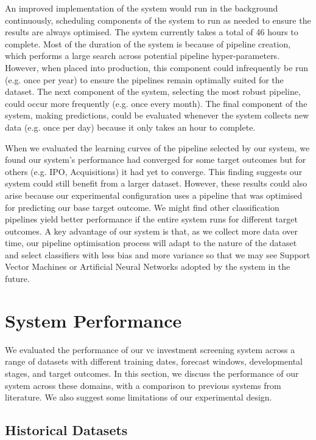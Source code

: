 \documentclass[../thesis/thesis.tex]{subfiles}
\begin{document}
An improved implementation of the system would run in the background continuously, scheduling components of the system to run as needed to ensure the results are always optimised. The system currently takes a total of 46 hours to complete. Most of the duration of the system is because of pipeline creation, which performs a large search across potential pipeline hyper-parameters. However, when placed into production, this component could infrequently be run (e.g. once per year) to ensure the pipelines remain optimally suited for the dataset. The next component of the system, selecting the most robust pipeline, could occur more frequently (e.g. once every month). The final component of the system, making predictions, could be evaluated whenever the system collects new data (e.g. once per day) because it only takes an hour to complete.

When we evaluated the learning curves of the pipeline selected by our system, we found our system's performance had converged for some target outcomes but for others (e.g. IPO, Acquisitions) it had yet to converge. This finding suggests our system could still benefit from a larger dataset. However, these results could also arise because our experimental configuration uses a pipeline that was optimised for predicting our base target outcome.  We might find other classification pipelines yield better performance if the entire system runs for different target outcomes. A key advantage of our system is that, as we collect more data over time, our pipeline optimisation process will adapt to the nature of the dataset and select classifiers with less bias and more variance so that we may see Support Vector Machines or Artificial Neural Networks adopted by the system in the future.

\section{System Performance}

We evaluated the performance of our \gls{vc} investment screening system across a range of datasets with different training dates, forecast windows, developmental stages, and target outcomes. In this section, we discuss the performance of our system across these domains, with a comparison to previous systems from literature. We also suggest some limitations of our experimental design.

\subsection{Historical Datasets}
\end{document}
